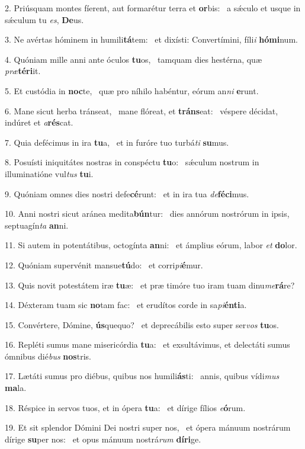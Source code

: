 2. Priúsquam montes fíerent, aut formarétur terra et \textbf{or}bis: \ast\  a sǽculo et usque in sǽculum tu \textit{es}, \textbf{De}us.\

3. Ne avértas hóminem in humili\textbf{tá}tem: \ast\  et dixísti: Convertímini, fíli\textit{i} \textbf{hó}\textbf{mi}num.\

4. Quóniam mille anni ante óculos \textbf{tu}os, \ast\  tamquam dies hestérna, quæ \textit{præ}\textbf{tér}\textbf{i}it.\

5. Et custódia in \textbf{noc}te, \ast\  quæ pro níhilo habéntur, eórum an\textit{ni} \textbf{e}runt.\

6. Mane sicut herba tránseat, \dag\  mane flóreat, et \textbf{tráns}eat: \ast\  véspere décidat, indúret et \textit{a}\textbf{rés}cat.\

7. Quia defécimus in ira \textbf{tu}a, \ast\  et in furóre tuo turbá\textit{ti} \textbf{su}mus.\

8. Posuísti iniquitátes nostras in conspéctu \textbf{tu}o: \ast\  sǽculum nostrum in illuminatióne vul\textit{tus} \textbf{tu}i.\

9. Quóniam omnes dies nostri defe\textbf{cé}runt: \ast\  et in ira tua \textit{de}\textbf{fé}\textbf{ci}mus.\

10. Anni nostri sicut aránea medita\textbf{bún}tur: \ast\  dies annórum nostrórum in ipsis, septuagín\textit{ta} \textbf{an}ni.\

11. Si autem in potentátibus, octogínta \textbf{an}ni: \ast\  et ámplius eórum, labor \textit{et} \textbf{do}lor.\

12. Quóniam supervénit mansue\textbf{tú}do: \ast\  et corri\textit{pi}\textbf{é}mur.\

13. Quis novit potestátem iræ \textbf{tu}æ: \ast\  et præ timóre tuo iram tuam dinu\textit{me}\textbf{rá}re?\

14. Déxteram tuam sic \textbf{no}tam fac: \ast\  et erudítos corde in sa\textit{pi}\textbf{én}\textbf{ti}a.\

15. Convértere, Dómine, \textbf{ús}quequo? \ast\  et deprecábilis esto super ser\textit{vos} \textbf{tu}os.\

16. Repléti sumus mane misericórdia \textbf{tu}a: \ast\  et exsultávimus, et delectáti sumus ómnibus dié\textit{bus} \textbf{nos}tris.\

17. Lætáti sumus pro diébus, quibus nos humili\textbf{ás}ti: \ast\  annis, quibus vídi\textit{mus} \textbf{ma}la.\

18. Réspice in servos tuos, et in ópera \textbf{tu}a: \ast\  et dírige fílios \textit{e}\textbf{ó}rum.\

19. Et sit splendor Dómini Dei nostri super nos, \dag\  et ópera mánuum nostrárum dírige \textbf{su}per nos: \ast\  et opus mánuum nostrá\textit{rum} \textbf{dí}\textbf{ri}ge.\

